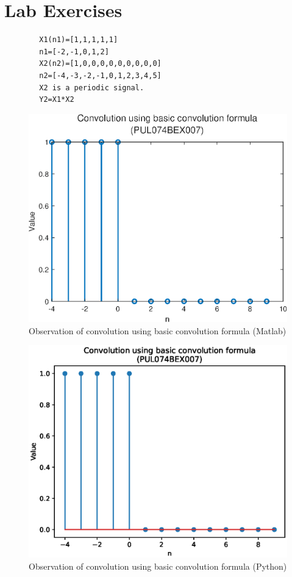 \documentclass{lab_sheet}
\begin{document}
    \section{Lab Exercises}
    \begin{verbatim}
        X1(n1)=[1,1,1,1,1]
        n1=[-2,-1,0,1,2]
        X2(n2)=[1,0,0,0,0,0,0,0,0,0]
        n2=[-4,-3,-2,-1,0,1,2,3,4,5]
        X2 is a periodic signal.
        Y2=X1*X2
    \end{verbatim}
    \begin{figure}[H]
        \centering
        \includegraphics[width=0.73\linewidth]{../Figures/lab_3_1_ml.eps}
        \caption{Observation of convolution using basic convolution formula (Matlab)}
        \label{fig:3_1_ml}
    \end{figure}
    \begin{figure}[H]
        \centering
        \includegraphics[width=0.8\linewidth]{../Figures/lab_3_1_py.eps}
        \caption{Observation of convolution using basic convolution formula (Python)}
        \label{fig:3_1_py}
    \end{figure}
\end{document}
